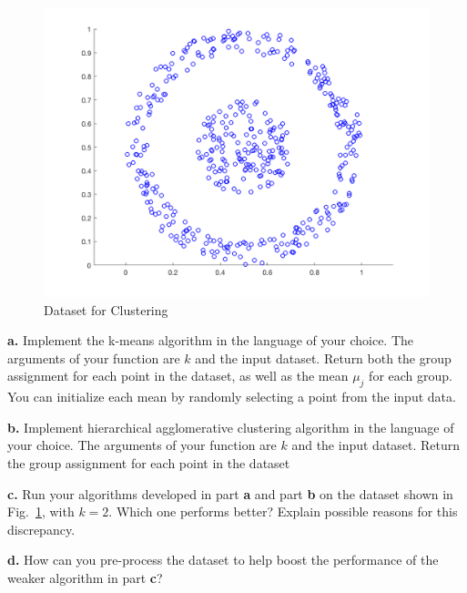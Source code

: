 \documentclass{article}
\begin{document}
\begin{figure}[h!]
\centering
\includegraphics[scale=0.25]{cluster_data.png}
\caption{Dataset for Clustering}
\label{fig:cluster}
\end{figure}

\textbf{a.} Implement the k-means algorithm in the language of your choice. The arguments of your function are $k$ and the input dataset. Return both the group assignment for each point in the dataset, as well as the mean $\mu_j$ for each group. You can initialize each mean by randomly selecting a point from the input data.

\textbf{b.} Implement hierarchical agglomerative clustering algorithm in the language of your choice. The arguments of your function are $k$ and the input dataset. Return the group assignment for each point in the dataset

\textbf{c.} Run your algorithms developed in part \textbf{a} and part \textbf{b} on the dataset shown in Fig.~\ref{fig:cluster}, with $k = 2$. Which one performs better? Explain possible reasons for this discrepancy.

\textbf{d.} How can you pre-process the dataset to help boost the performance of the weaker algorithm in part \textbf{c}?
\end{document}
